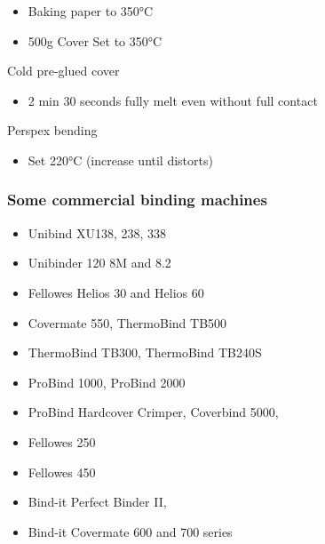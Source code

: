 \documentclass[
]{article}
\providecommand{\tightlist}{%
  \setlength{\itemsep}{0pt}\setlength{\parskip}{0pt}}
\begin{document}
\begin{itemize}
\tightlist
\item
  Baking paper to 350°C
\item
  500g Cover Set to 350°C
\end{itemize}

Cold pre-glued cover

\begin{itemize}
\tightlist
\item
  2 min 30 seconds fully melt even without full contact
\end{itemize}

Perspex bending

\begin{itemize}
\tightlist
\item
  Set 220°C (increase until distorts)
\end{itemize}

\subsubsection{Some commercial binding machines}

\begin{itemize}
\tightlist
\item
  Unibind XU138, 238, 338
\item
  Unibinder 120 8M and 8.2
\item
  Fellowes Helios 30 and Helios 60
\item
  Covermate 550, ThermoBind TB500
\item
  ThermoBind TB300, ThermoBind TB240S
\item
  ProBind 1000, ProBind 2000
\item
  ProBind Hardcover Crimper, Coverbind 5000,
\item
  Fellowes 250
\item
  Fellowes 450
\item
  Bind-it Perfect Binder II,
\item
  Bind-it Covermate 600 and 700 series
\end{itemize}
\end{document}
